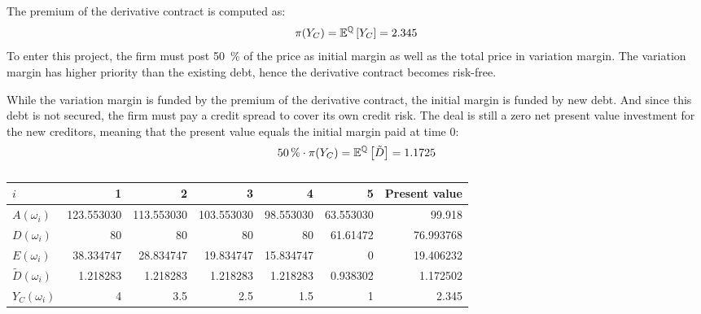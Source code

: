 \documentclass[../main.tex]{subfiles}
\begin{document}
        The premium of the derivative contract is computed as:
        \begin{equation}
            \pi(Y_C) = \mathbb{E}^{\mathbb{Q}}\left[Y_{C}\right] = \num{2.345}
        \end{equation}
        To enter this project, the firm must post \qty[round-precision=0]{50}{\percent}
        of the price as initial margin as well as the total price in variation margin.
        The variation margin has higher priority than the existing debt, hence the derivative contract becomes risk-free.

        While the variation margin is funded by the premium of the derivative contract, the initial margin is funded by new debt. And since this debt is not secured, the firm must pay a credit spread to cover its own credit risk. The deal is still a zero net present value investment for the new creditors, meaning that the present value equals the initial margin paid at time 0:
        \begin{equation}
            \qty[round-precision=0]{50}{\percent} 
            \cdot 
            \pi(Y_C) = \mathbb{E}^{\rnmeasure}\left[\tilde{D}\right] = \num{1.1725}
        \end{equation}

        \begin{table}[H]
            \centering
            \begin{tabular}{l|rrrrr||r}
                $i$ & 1 & 2 & 3 & 4 & 5 & Present value \\
                \hline
                $A(\omega_{i})$ & 
                    \num{123.553030} & \num{113.553030} & \num{103.553030} & \num{98.553030} & \num{63.553030} & \num{99.918} \\
                $D(\omega_{i})$ & 
                    \num{80} & \num{80} & \num{80} & \num{80} & \num{61.61472} & \num{76.993768} \\
                $E(\omega_{i})$ & 
                    \num{38.334747} & \num{28.834747} & \num{19.834747} & \num{15.834747} & \num{0} & \num{19.406232} \\
                $\tilde{D}(\omega_{i})$ & 
                    \num{1.218283} & \num{1.218283} & \num{1.218283} & \num{1.218283} & \num{0.938302} & \num{1.172502} \\
                $Y_C(\omega_{i})$ & 
                    \num{4} & \num{3.5} & \num{2.5} & \num{1.5} & \num{1} & \num{2.345} \\
            \end{tabular}
            \caption{}
            \label{tbl:example-collateralized-derivative}
        \end{table}
\end{document}
